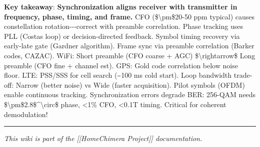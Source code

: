 \textbf{Key takeaway}: \textbf{Synchronization aligns receiver with
transmitter in frequency, phase, timing, and frame.} CFO
(\$\textbackslash pm\$20-50 ppm typical) causes constellation
rotation-\/-\/-correct with preamble correlation. Phase tracking uses
PLL (Costas loop) or decision-directed feedback. Symbol timing recovery
via early-late gate (Gardner algorithm). Frame sync via preamble
correlation (Barker codes, CAZAC). WiFi: Short preamble (CFO coarse +
AGC) \$\textbackslash rightarrow\$ Long preamble (CFO fine + channel
est). GPS: Gold code correlation below noise floor. LTE: PSS/SSS for
cell search (\textasciitilde100 ms cold start). Loop bandwidth
trade-off: Narrow (better noise) vs Wide (faster acquisition). Pilot
symbols (OFDM) enable continuous tracking. Synchronization errors
degrade BER: 256-QAM needs
\$\textbackslash pm\$2.8\$\^{}\textbackslash circ\$ phase, \textless1\%
CFO, \textless0.1T timing. Critical for coherent demodulation!

\begin{center}\rule{0.5\linewidth}{0.5pt}\end{center}

\emph{This wiki is part of the {[}{[}Home\textbar Chimera Project{]}{]}
documentation.}
